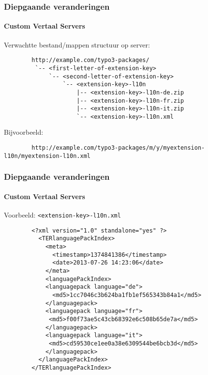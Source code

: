 
\begin{frame}[fragile]
	\frametitle{Diepgaande veranderingen}
	\framesubtitle{Custom Vertaal Servers}

	Verwachtte bestand/mappen structuur op server:

	\begin{lstlisting}
		http://example.com/typo3-packages/
		 `-- <first-letter-of-extension-key>
		     `-- <second-letter-of-extension-key>
		         `-- <extension-key>-l10n
		             |-- <extension-key>-l10n-de.zip
		             |-- <extension-key>-l10n-fr.zip
		             |-- <extension-key>-l10n-it.zip
		             `-- <extension-key>-l10n.xml
	\end{lstlisting}

	Bijvoorbeeld:

	\begin{lstlisting}
		http://example.com/typo3-packages/m/y/myextension-l10n/myextension-l10n.xml
	\end{lstlisting}

\end{frame}


\begin{frame}[fragile]
	\frametitle{Diepgaande veranderingen}
	\framesubtitle{Custom Vertaal Servers}

	Voorbeeld: \texttt{<extension-key>-l10n.xml}

	\lstset{
		basicstyle=\tiny\ttfamily
	}

	\begin{lstlisting}
		<?xml version="1.0" standalone="yes" ?>
		  <TERlanguagePackIndex>
		    <meta>
		      <timestamp>1374841386</timestamp>
		      <date>2013-07-26 14:23:06</date>
		    </meta>
		    <languagePackIndex>
		    <languagepack language="de">
		      <md5>1cc7046c3b624ba1fb1ef565343b84a1</md5>
		    </languagepack>
		    <languagepack language="fr">
		     <md5>f00f73ae5c43cb68392e6c508b65de7a</md5>
		    </languagepack>
		    <languagepack language="it">
		     <md5>cd59530ce1ee0a38e6309544be6bcb3d</md5>
		    </languagepack>
		  </languagePackIndex>
		</TERlanguagePackIndex>
	\end{lstlisting}

\end{frame}

